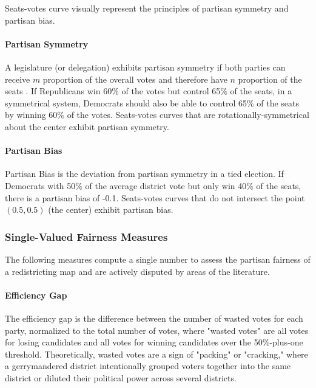 Seats-votes curve visually represent the principles of partisan symmetry and partisan bias.

\paragraph{Partisan Symmetry}

A legislature (or delegation) exhibits partisan symmetry if both parties can receive $m$ proportion of the overall votes and therefore have $n$ proportion of the seats \parencite{katz2020}. If Republicans win 60\% of the votes but control 65\% of the seats, in a symmetrical system, Democrats should also be able to control 65\% of the seats by winning 60\% of the votes. Seats-votes curves that are rotationally-symmetrical about the center exhibit partisan symmetry.

\paragraph{Partisan Bias}
\label{sec:bias}

Partisan Bias is the deviation from partisan symmetry in a tied election. If Democrats with 50\% of the average district vote but only win 40\% of the seats, there is a partisan bias of -0.1. Seats-votes curves that do not intersect the point $(0.5, 0.5)$ (the center) exhibit partisan bias.

\subsubsection{Single-Valued Fairness Measures}

The following measures compute a single number to assess the partisan fairness of a redistricting map and are actively disputed by areas of the literature.

\paragraph{Efficiency Gap}
\label{sec:effgap}

The efficiency gap is the difference between the number of wasted votes for each party, normalized to the total number of votes, where "wasted votes" are all votes for losing candidates and all votes for winning candidates over the 50\%-plus-one threshold. Theoretically, wasted votes are a sign of "packing" or "cracking," where a gerrymandered district intentionally grouped voters together into the same district or diluted their political power across several districts. \parencite{stephanopoulos2015}

